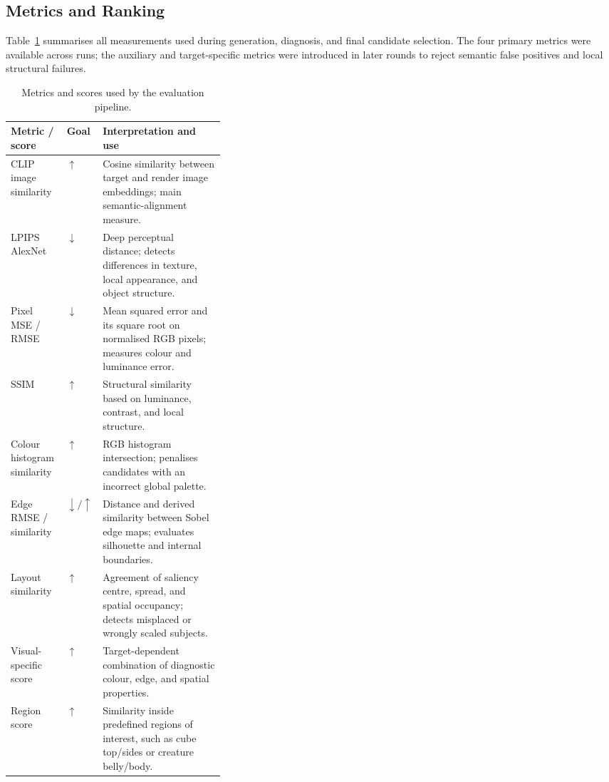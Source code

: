 \documentclass[runningheads]{llncs}
\begin{document}
\subsection{Metrics and Ranking}

Table~\ref{tab:metrics} summarises all measurements used during generation, diagnosis, and final candidate selection. The four primary metrics were available across runs; the auxiliary and target-specific metrics were introduced in later rounds to reject semantic false positives and local structural failures.

\begin{table}[H]
\centering
\caption{Metrics and scores used by the evaluation pipeline.}
\label{tab:metrics}
\footnotesize
\setlength{\tabcolsep}{4pt}
\renewcommand{\arraystretch}{1.04}
\begin{tabularx}{\linewidth}{>{\raggedright\arraybackslash}p{0.25\linewidth}>{\centering\arraybackslash}p{0.10\linewidth}>{\raggedright\arraybackslash}X}
\toprule
Metric / score & Goal & Interpretation and use \\
\midrule
CLIP image similarity~\cite{clip} & $\uparrow$ & Cosine similarity between target and render image embeddings; main semantic-alignment measure. \\
LPIPS AlexNet~\cite{lpips} & $\downarrow$ & Deep perceptual distance; detects differences in texture, local appearance, and object structure. \\
Pixel MSE / RMSE & $\downarrow$ & Mean squared error and its square root on normalised RGB pixels; measures colour and luminance error. \\
SSIM & $\uparrow$ & Structural similarity based on luminance, contrast, and local structure. \\
Colour histogram similarity & $\uparrow$ & RGB histogram intersection; penalises candidates with an incorrect global palette. \\
Edge RMSE / similarity & $\downarrow/\uparrow$ & Distance and derived similarity between Sobel edge maps; evaluates silhouette and internal boundaries. \\
Layout similarity & $\uparrow$ & Agreement of saliency centre, spread, and spatial occupancy; detects misplaced or wrongly scaled subjects. \\
Visual-specific score & $\uparrow$ & Target-dependent combination of diagnostic colour, edge, and spatial properties. \\
Region score & $\uparrow$ & Similarity inside predefined regions of interest, such as cube top/sides or creature belly/body. \\

\end{tabularx}
\end{table}
\end{document}
